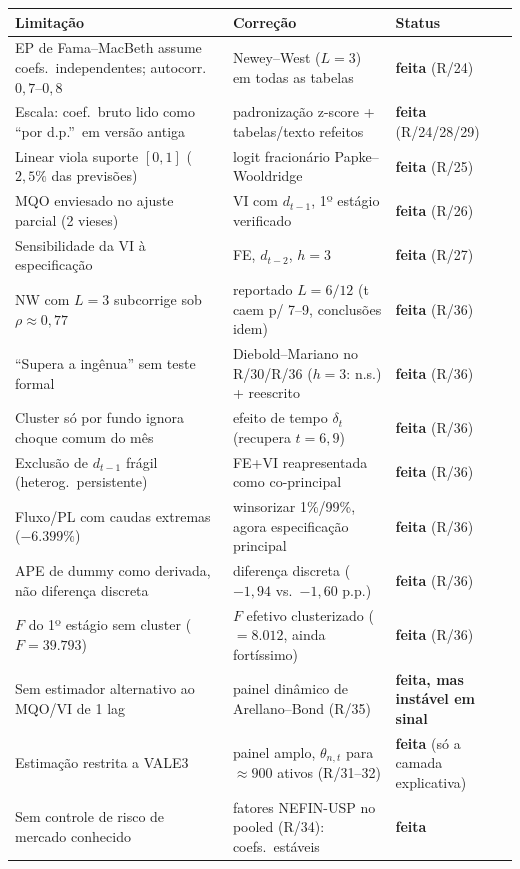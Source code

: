 \documentclass[11pt,a4paper]{article}
\begin{document}
\begin{center}\footnotesize
\begin{tabular}{@{}p{5.2cm}p{5.7cm}l@{}}
\toprule
Limitação & Correção & Status \\
\midrule
EP de Fama--MacBeth assume coefs.\ independentes; autocorr.\ $0{,}7$--$0{,}8$ & Newey--West ($L=3$) em todas as tabelas & \textbf{feita} (R/24) \\
Escala: coef.\ bruto lido como ``por d.p.''\ em versão antiga & padronização z-score + tabelas/texto refeitos & \textbf{feita} (R/24/28/29) \\
Linear viola suporte $[0,1]$ ($2{,}5\%$ das previsões) & logit fracionário Papke--Wooldridge & \textbf{feita} (R/25) \\
MQO enviesado no ajuste parcial (2 vieses) & VI com $d_{t-1}$, 1º estágio verificado & \textbf{feita} (R/26) \\
Sensibilidade da VI à especificação & FE, $d_{t-2}$, $h=3$ & \textbf{feita} (R/27) \\
NW com $L=3$ subcorrige sob $\rho\approx0{,}77$ & reportado $L=6/12$ (t caem p/ 7--9, conclusões idem) & \textbf{feita} (R/36) \\
``Supera a ingênua'' sem teste formal & Diebold--Mariano no R/30/R/36 ($h=3$: n.s.) + reescrito & \textbf{feita} (R/36) \\
Cluster só por fundo ignora choque comum do mês & efeito de tempo $\delta_t$ (recupera $t=6{,}9$) & \textbf{feita} (R/36) \\
Exclusão de $d_{t-1}$ frágil (heterog.\ persistente) & FE+VI reapresentada como co-principal & \textbf{feita} (R/36) \\
Fluxo/PL com caudas extremas ($-6.399\%$) & winsorizar 1\%/99\%, agora especificação principal & \textbf{feita} (R/36) \\
APE de dummy como derivada, não diferença discreta & diferença discreta ($-1{,}94$ vs.\ $-1{,}60$ p.p.) & \textbf{feita} (R/36) \\
$F$ do 1º estágio sem cluster ($F=39.793$) & $F$ efetivo clusterizado ($=8.012$, ainda fortíssimo) & \textbf{feita} (R/36) \\
Sem estimador alternativo ao MQO/VI de 1 lag & painel dinâmico de Arellano--Bond (R/35) & \textbf{feita, mas instável em sinal} \\
Estimação restrita a VALE3 & painel amplo, $\theta_{n,t}$ para $\approx900$ ativos (R/31--32) & \textbf{feita} (só a camada explicativa) \\
Sem controle de risco de mercado conhecido & fatores NEFIN-USP no pooled (R/34): coefs.\ estáveis & \textbf{feita} \\

\end{tabular}
\end{center}
\end{document}
